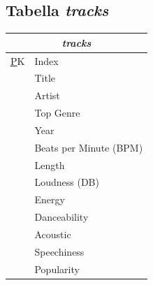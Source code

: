 \documentclass[12pt, a4paper]{article}
\begin{document}
\subsection{Tabella \textit{tracks}}

\begin{table}[h]
\centering
\begin{tabular}{ll|}
\hline
\multicolumn{2}{|c|}{\textit{\textbf{tracks}}} \\ \hline
\multicolumn{1}{|l|}{{\ul PK}} & Index \\ \hline
\multicolumn{1}{l|}{} & Title \\ \cline{2-2} 
\multicolumn{1}{l|}{} & Artist \\ \cline{2-2} 
\multicolumn{1}{l|}{} & Top Genre \\ \cline{2-2} 
\multicolumn{1}{l|}{} & Year \\ \cline{2-2} 
\multicolumn{1}{l|}{} & Beats per Minute (BPM) \\ \cline{2-2} 
\multicolumn{1}{l|}{} & Length \\ \cline{2-2} 
\multicolumn{1}{l|}{} & Loudness (DB) \\ \cline{2-2} 
\multicolumn{1}{l|}{} & Energy \\ \cline{2-2} 
\multicolumn{1}{l|}{} & Danceability \\ \cline{2-2} 
\multicolumn{1}{l|}{} & Acoustic \\ \cline{2-2} 
\multicolumn{1}{l|}{} & Speechiness \\ \cline{2-2} 
\multicolumn{1}{l|}{} & Popularity \\ \cline{2-2} 
\end{tabular}
\end{table}
\end{document}
